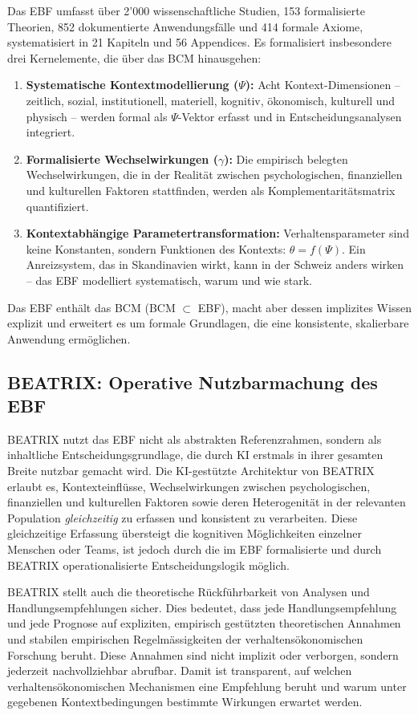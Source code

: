 \documentclass[11pt,a4paper]{article}
\begin{document}
Das EBF umfasst über 2'000 wissenschaftliche Studien, 153 formalisierte Theorien, 852 dokumentierte Anwendungsfälle und 414 formale Axiome, systematisiert in 21 Kapiteln und 56 Appendices. Es formalisiert insbesondere drei Kernelemente, die über das BCM hinausgehen:

\begin{enumerate}
    \item \textbf{Systematische Kontextmodellierung ($\Psi$):} Acht Kontext-Dimensionen -- zeitlich, sozial, institutionell, materiell, kognitiv, ökonomisch, kulturell und physisch -- werden formal als $\Psi$-Vektor erfasst und in Entscheidungsanalysen integriert.
    \item \textbf{Formalisierte Wechselwirkungen ($\gamma$):} Die empirisch belegten Wechselwirkungen, die in der Realität zwischen psychologischen, finanziellen und kulturellen Faktoren stattfinden, werden als Komplementaritätsmatrix quantifiziert.
    \item \textbf{Kontextabhängige Parametertransformation:} Verhaltensparameter sind keine Konstanten, sondern Funktionen des Kontexts: $\theta = f(\Psi)$. Ein Anreizsystem, das in Skandinavien wirkt, kann in der Schweiz anders wirken -- das EBF modelliert systematisch, warum und wie stark.
\end{enumerate}

Das EBF enthält das BCM (BCM $\subset$ EBF), macht aber dessen implizites Wissen explizit und erweitert es um formale Grundlagen, die eine konsistente, skalierbare Anwendung ermöglichen.

\subsection{BEATRIX: Operative Nutzbarmachung des EBF}

BEATRIX nutzt das EBF nicht als abstrakten Referenzrahmen, sondern als inhaltliche Entscheidungsgrundlage, die durch KI erstmals in ihrer gesamten Breite nutzbar gemacht wird. Die KI-gestützte Architektur von BEATRIX erlaubt es, Kontexteinflüsse, Wechselwirkungen zwischen psychologischen, finanziellen und kulturellen Faktoren sowie deren Heterogenität in der relevanten Population \emph{gleichzeitig} zu erfassen und konsistent zu verarbeiten. Diese gleichzeitige Erfassung übersteigt die kognitiven Möglichkeiten einzelner Menschen oder Teams, ist jedoch durch die im EBF formalisierte und durch BEATRIX operationalisierte Entscheidungslogik möglich.

BEATRIX stellt auch die theoretische Rückführbarkeit von Analysen und Handlungsempfehlungen sicher. Dies bedeutet, dass jede Handlungsempfehlung und jede Prognose auf expliziten, empirisch gestützten theoretischen Annahmen und stabilen empirischen Regelmässigkeiten der verhaltensökonomischen Forschung beruht. Diese Annahmen sind nicht implizit oder verborgen, sondern jederzeit nachvollziehbar abrufbar. Damit ist transparent, auf welchen verhaltensökonomischen Mechanismen eine Empfehlung beruht und warum unter gegebenen Kontextbedingungen bestimmte Wirkungen erwartet werden.
\end{document}
